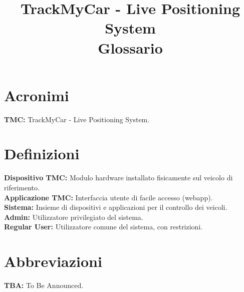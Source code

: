 \documentclass[a4paper,12pt]{article}
\begin{document}
\title{\textbf{TrackMyCar - Live Positioning System} \\ Glossario}
\maketitle

\section{Acronimi}
\textbf{TMC:} TrackMyCar - Live Positioning System.

\section{Definizioni}
\textbf{Dispositivo TMC:} Modulo hardware installato fisicamente sul veicolo di riferimento.\\
\textbf{Applicazione TMC:} Interfaccia utente di facile accesso (webapp).\\
\textbf{Sistema:} Insieme di dispositivi e applicazioni per il controllo dei veicoli.\\
\textbf{Admin:} Utilizzatore privilegiato del sistema.\\
\textbf{Regular User:} Utilizzatore comune del sistema, con restrizioni.\\

\section{Abbreviazioni}
\textbf{TBA:} To Be Announced.
\end{document}
